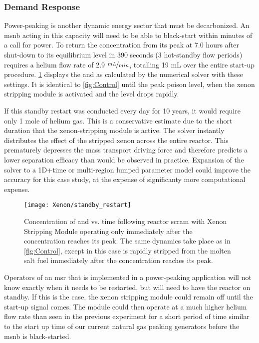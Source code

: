 \subsubsection{Demand Response}
Power-peaking is another dynamic energy sector that must be decarbonized. An \acs{msnb} acting in this capacity will need to be able to black-start within minutes of a call for power. To return the \Xe concentration from its peak at 7.0 hours after shut-down to its equilibrium level in 390 seconds (3 hot-standby flow periods) requires a helium flow rate of 2.9 $\nicefrac{mL}{min}$, totalling 19 mL over the entire start-up procedure. \cref{fig:Standby} displays the \I and \Xe as calculated by the numerical solver with these settings. It is identical to \cref{fig:Control} until the peak poison level, when the xenon stripping module is activated and the \Xe level drops rapidly. 

If this standby restart was conducted every day for 10 years, it would require only 1 mole of helium gas. This is a conservative estimate due to the short duration that the xenon-stripping module is active. The solver instantly distributes the effect of the stripped xenon across the entire reactor. This prematurely depresses the mass transport driving force and therefore predicts a lower separation efficacy than would be observed in practice. Expansion of the solver to a 1D+time or multi-region lumped parameter model could improve the accuracy for this case study, at the expense of significanty more computational expense.

\begin{figure}[ht!]
    \centering
    \texttt{[image: Xenon/standby\_restart]}
    \caption[Concentration of \I and \Xe vs. time following reactor scram - Standby Mode]{Concentration of \I and \Xe vs. time following reactor scram with Xenon Stripping Module operating only immediately after the \Xe concentration reaches its peak. The same dynamics take place as in \cref{fig:Control}, except in this case \Xe is rapidly stripped from the molten salt fuel immediately after the \Xe concentration reaches its peak.}
    \label{fig:Standby}
\end{figure}

\newpage
Operators of an \acs{msr} that is implemented in a power-peaking application will not know exactly when it needs to be restarted, but will need to have the reactor on standby. If this is the case, the xenon stripping module could remain off until the start-up signal comes. The module could then operate at a much higher helium flow rate than seen in the previous experiment for a short period of time similar to the start up time of our current natural gas peaking generators \cite{GE} before the \acs{msnb} is black-started. 

